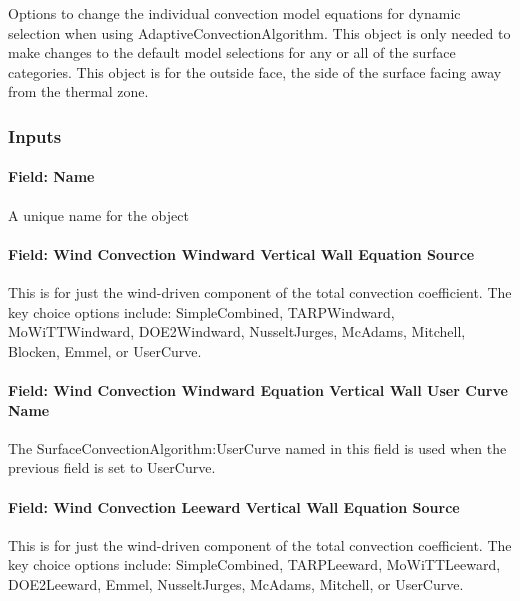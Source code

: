 Options to change the individual convection model equations for dynamic selection when using AdaptiveConvectionAlgorithm. This object is only needed to make changes to the default model selections for any or all of the surface categories. This object is for the outside face, the side of the surface facing away from the thermal zone.

\subsubsection{Inputs}\label{inputs-7}

\paragraph{Field: Name}\label{field-name-6}

A unique name for the object

\paragraph{Field: Wind Convection Windward Vertical Wall Equation Source}\label{field-wind-convection-windward-vertical-wall-equation-source}

This is for just the wind-driven component of the total convection coefficient. The key choice options include: SimpleCombined, TARPWindward, MoWiTTWindward, DOE2Windward, NusseltJurges, McAdams, Mitchell, Blocken, Emmel, or UserCurve.

\paragraph{Field: Wind Convection Windward Equation Vertical Wall User Curve Name}\label{field-wind-convection-windward-equation-vertical-wall-user-curve-name}

The SurfaceConvectionAlgorithm:UserCurve named in this field is used when the previous field is set to UserCurve.

\paragraph{Field: Wind Convection Leeward Vertical Wall Equation Source}\label{field-wind-convection-leeward-vertical-wall-equation-source}

This is for just the wind-driven component of the total convection coefficient. The key choice options include: SimpleCombined, TARPLeeward, MoWiTTLeeward, DOE2Leeward, Emmel, NusseltJurges, McAdams, Mitchell, or UserCurve.

